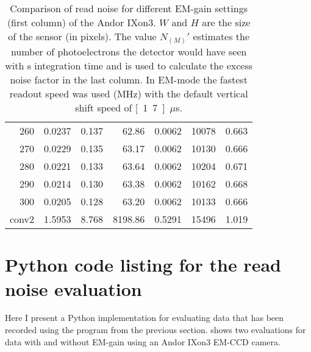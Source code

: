 \begin{table}[!htbp]
\begin{tabular}{r l l r  l r l}
260 & 0.0237 & 0.137 & 62.86 & 0.0062 & 10078 & 0.663 \\
270 & 0.0229 & 0.135 & 63.17 & 0.0062 & 10130 & 0.666 \\
280 & 0.0221 & 0.133 & 63.64 & 0.0062 & 10204 & 0.671 \\
290 & 0.0214 & 0.130 & 63.38 & 0.0062 & 10162 & 0.668 \\
300 & 0.0205 & 0.128 & 63.20 & 0.0062 & 10133 & 0.666 \\
conv2 & 1.5953 & 8.768 & 8198.86 & 0.5291 & 15496 & 1.019 \\
\bottomrule
\end{tabular}
\caption{Comparison of read noise for different EM-gain settings
  (first column) of the Andor IXon3. $W$ and $H$ are the size of the sensor (in pixels). The value $N_{(M)}'$
  estimates the number of photoelectrons the detector would have
  seen with \unit[1]{s} integration time and is used to calculate
  the excess noise factor in the last column. In EM-mode the fastest
  readout speed was used (\unit[10]{MHz}) with the default vertical shift speed of
  \unit[1.7]{$\mu$s}.}
  \label{tab:ixon-table}
\end{table}

\newpage

\section{Python code listing for the read noise evaluation}
\label{sec:python-readnoise-eval}
Here I present a Python implementation for evaluating data that has
been recorded using the program from the previous
section.  shows two evaluations for data with and
without EM-gain using an Andor IXon3 EM-CCD camera.

